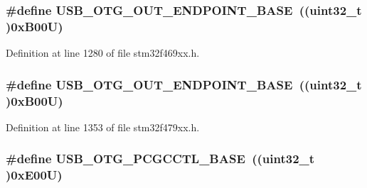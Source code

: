 \subsubsection[{\texorpdfstring{U\+S\+B\+\_\+\+O\+T\+G\+\_\+\+O\+U\+T\+\_\+\+E\+N\+D\+P\+O\+I\+N\+T\+\_\+\+B\+A\+SE}{USB_OTG_OUT_ENDPOINT_BASE}}]{\setlength{\rightskip}{0pt plus 5cm}\#define U\+S\+B\+\_\+\+O\+T\+G\+\_\+\+O\+U\+T\+\_\+\+E\+N\+D\+P\+O\+I\+N\+T\+\_\+\+B\+A\+SE~((uint32\+\_\+t )0x\+B00\+U)}\hypertarget{group___peripheral__memory__map_gaf0e972b8f028ecf44a652029efbd4642}{}\label{group___peripheral__memory__map_gaf0e972b8f028ecf44a652029efbd4642}


Definition at line 1280 of file stm32f469xx.\+h.

\subsubsection[{\texorpdfstring{U\+S\+B\+\_\+\+O\+T\+G\+\_\+\+O\+U\+T\+\_\+\+E\+N\+D\+P\+O\+I\+N\+T\+\_\+\+B\+A\+SE}{USB_OTG_OUT_ENDPOINT_BASE}}]{\setlength{\rightskip}{0pt plus 5cm}\#define U\+S\+B\+\_\+\+O\+T\+G\+\_\+\+O\+U\+T\+\_\+\+E\+N\+D\+P\+O\+I\+N\+T\+\_\+\+B\+A\+SE~((uint32\+\_\+t )0x\+B00\+U)}\hypertarget{group___peripheral__memory__map_gaf0e972b8f028ecf44a652029efbd4642}{}\label{group___peripheral__memory__map_gaf0e972b8f028ecf44a652029efbd4642}


Definition at line 1353 of file stm32f479xx.\+h.

\subsubsection[{\texorpdfstring{U\+S\+B\+\_\+\+O\+T\+G\+\_\+\+P\+C\+G\+C\+C\+T\+L\+\_\+\+B\+A\+SE}{USB_OTG_PCGCCTL_BASE}}]{\setlength{\rightskip}{0pt plus 5cm}\#define U\+S\+B\+\_\+\+O\+T\+G\+\_\+\+P\+C\+G\+C\+C\+T\+L\+\_\+\+B\+A\+SE~((uint32\+\_\+t )0x\+E00\+U)}\hypertarget{group___peripheral__memory__map_gaa9766975aca084c257730879568bc7cf}{}\label{group___peripheral__memory__map_gaa9766975aca084c257730879568bc7cf}


